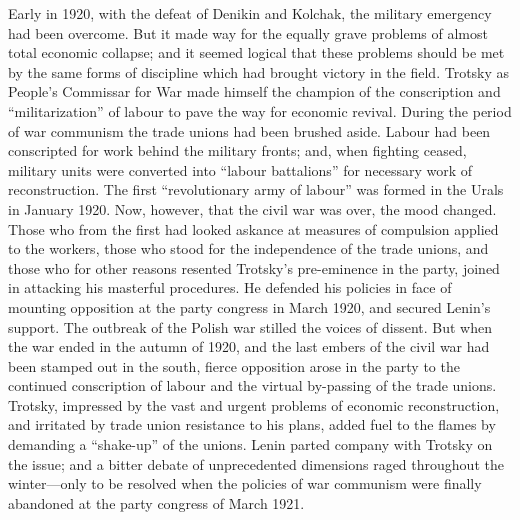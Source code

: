 Early in 1920, with the defeat of Denikin and Kolchak, the military emergency had been overcome. But it made way for the equally grave problems of almost total economic collapse; and it seemed logical that these problems should be met by the same forms of discipline which had brought victory in the field. Trotsky as People's Commissar for War made himself the champion of the conscription and ``militarization'' of labour to pave the way for economic revival. During the period of war communism the trade unions had been brushed aside. Labour had been conscripted for work behind the military fronts; and, when fighting ceased, military units were converted into ``labour battalions'' for necessary work of reconstruction. The first ``revolutionary army of labour'' was formed in the Urals in January 1920. Now, however, that the civil war was over, the mood changed. Those who from the first had looked askance at measures of compulsion applied to the workers, those who stood for the independence of the trade unions, and those who for other reasons resented Trotsky's pre-eminence in the party, joined in attacking his masterful procedures. He defended his policies in face of mounting opposition at the party congress in March 1920, and secured Lenin's support. The outbreak of the Polish war stilled the voices of dissent. But when the war ended in the autumn of 1920, and the last embers of the civil war had been stamped out in the south, fierce opposition arose in the party to the continued conscription of labour and the virtual by-passing of the trade unions. Trotsky, impressed by the vast and urgent problems of economic reconstruction, and irritated by trade union resistance to his plans, added fuel to the flames by demanding a ``shake-up'' of the unions. Lenin parted company with Trotsky on the issue; and a bitter debate of unprecedented dimensions raged throughout the winter---only to be resolved when the policies of war communism were finally abandoned at the party congress of March 1921. 

